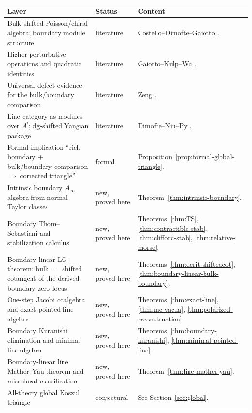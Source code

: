 \begin{center}
\renewcommand{\arraystretch}{1.2}
\begin{longtable}{|p{}|p{}|p{}|}
\hline
\textbf{Layer} & \textbf{Status} & \textbf{Content} \\
\hline
Bulk shifted Poisson/chiral algebra; boundary module structure & literature & Costello--Dimofte--Gaiotto \cite{CDG20}. \\
\hline
Higher perturbative operations and quadratic identities & literature & Gaiotto--Kulp--Wu \cite{GKW24}. \\
\hline
Universal defect evidence for the bulk/boundary comparison & literature & Zeng \cite{Zeng23}. \\
\hline
Line category as modules over $A^!$; dg-shifted Yangian package & literature & Dimofte--Niu--Py \cite{DNP25}. \\
\hline
Formal implication ``rich boundary + bulk/boundary comparison $\Rightarrow$ corrected triangle'' & formal & Proposition~\ref{prop:formal-global-triangle}. \\
\hline
Intrinsic boundary $A_\infty$ algebra from normal Taylor classes & new, proved here & Theorem~\ref{thm:intrinsic-boundary}. \\
\hline
Boundary Thom--Sebastiani and stabilization calculus & new, proved here & Theorems~\ref{thm:TS}, \ref{thm:contractible-stab}, \ref{thm:clifford-stab}, \ref{thm:relative-morse}. \\
\hline
Boundary-linear LG theorem: bulk $=$ shifted cotangent of the derived boundary zero locus & new, proved here & Theorems~\ref{thm:dcrit-shiftedcot}, \ref{thm:boundary-linear-bulk-boundary}. \\
\hline
One-step Jacobi coalgebra and exact pointed line algebra & new, proved here & Theorems~\ref{thm:exact-line}, \ref{thm:mc-vacua}, \ref{thm:polarized-reconstruction}. \\
\hline
Boundary Kuranishi elimination and minimal line algebra & new, proved here & Theorems~\ref{thm:boundary-kuranishi}, \ref{thm:minimal-pointed-line}. \\
\hline
Boundary-linear line Mather--Yau theorem and microlocal classification & new, proved here & Theorem~\ref{thm:line-mather-yau}. \\
\hline
All-theory global Koszul triangle & conjectural & See Section~\ref{sec:global}. \\
\hline
\end{longtable}
\end{center}


